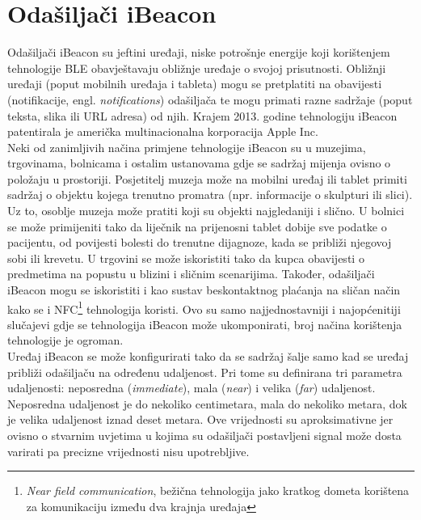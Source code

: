 \chapter{Odašiljači iBeacon}
\label{chap:ibeacon}

Odašiljači iBeacon su jeftini uređaji, niske potrošnje energije koji korištenjem tehnologije BLE obavještavaju obližnje uređaje o svojoj prisutnosti. 
Obližnji uređaji (poput mobilnih uređaja i tableta) mogu se pretplatiti na obavijesti (notifikacije, engl. \textit{notifications}) odašiljača te mogu primati razne sadržaje (poput teksta, slika ili URL adresa) od njih. 
Krajem 2013. godine tehnologiju iBeacon patentirala je američka multinacionalna korporacija Apple Inc.
\\

Neki od zanimljivih načina primjene tehnologije iBeacon su u muzejima, trgovinama, bolnicama i ostalim ustanovama gdje se sadržaj mijenja ovisno o položaju u prostoriji. 
Posjetitelj muzeja može na mobilni uređaj ili tablet primiti sadržaj o objektu kojega trenutno promatra (npr. informacije o skulpturi ili slici). Uz to, osoblje muzeja može pratiti koji su objekti najgledaniji i slično. 
U bolnici se može primijeniti tako da liječnik na prijenosni tablet dobije sve podatke o pacijentu, od povijesti bolesti do trenutne dijagnoze, kada se približi njegovoj sobi ili krevetu. 
U trgovini se može iskoristiti tako da kupca obavijesti o predmetima na popustu u blizini i sličnim scenarijima. 
Također, odašiljači iBeacon mogu se iskoristiti i kao sustav beskontaktnog plaćanja na sličan način kako se i NFC\footnote{\textit{Near field communication}, bežična tehnologija jako kratkog dometa korištena za komunikaciju između dva krajnja uređaja} tehnologija koristi.
Ovo su samo najjednostavniji i najopćenitiji slučajevi gdje se tehnologija iBeacon može ukomponirati, broj načina korištenja tehnologije je ogroman.
\\

Uređaj iBeacon se može konfigurirati tako da se sadržaj šalje samo kad se uređaj približi odašiljaču na određenu udaljenost. 
Pri tome su definirana tri parametra udaljenosti: neposredna (\textit{immediate}), mala (\textit{near}) i velika (\textit{far}) udaljenost. 
Neposredna udaljenost je do nekoliko centimetara, mala do nekoliko metara, dok je velika udaljenost iznad deset metara. 
Ove vrijednosti su aproksimativne jer ovisno o stvarnim uvjetima u kojima su odašiljači postavljeni signal može dosta varirati pa precizne vrijednosti nisu upotrebljive.
\\

